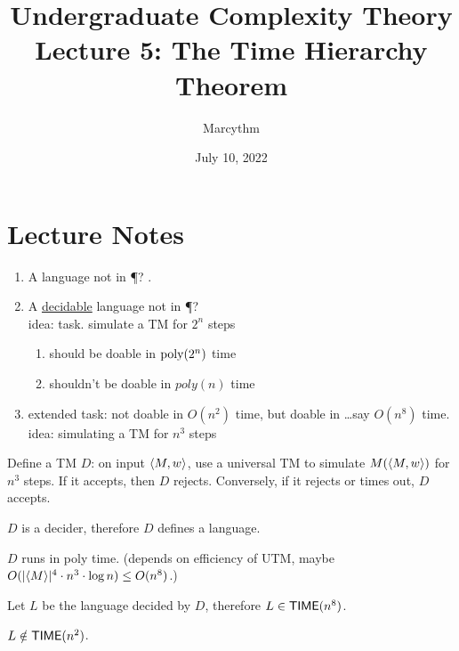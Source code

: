 \documentclass{article}
\title{Undergraduate Complexity Theory \\ Lecture 5: The Time Hierarchy Theorem}
\author{Marcythm}
\date{July 10, 2022}
\begin{document}
\maketitle{}

\section{Lecture Notes}

\begin{enumerate}
  \item A language not in \P? .

  \item A \ul{decidable} language not in \P? \\
        idea: task. simulate a TM for \(2^n\) steps
  \begin{enumerate}
    \item should be doable in \(\operatorname{poly}(2^n)\) time
    \item shouldn't be doable in \(poly(n)\) time
  \end{enumerate}

  \item extended task: not doable in \(O(n^2)\) time, but doable in \ldots say \(O(n^8)\) time. \\
        idea: simulating a TM for \(n^3\) steps
\end{enumerate}

\begin{definition}
  Define a TM \(D\): on input \(\langle M, w\rangle\), use a universal TM to simulate \(M\lparen\langle M, w\rangle\rparen\) for \(n^3\) steps. If it accepts, then \(D\) rejects. Conversely, if it rejects or times out, \(D\) accepts.
\end{definition}

\begin{fact}
  \(D\) is a decider, therefore \(D\) defines a language.
\end{fact}

\begin{fact}
  \(D\) runs in poly time. (depends on efficiency of UTM, maybe \(O\lparen\lvert\langle M\rangle\rvert^4 \cdot n^3 \cdot \log{n}\rparen \leq O(n^8)\).)
\end{fact}

\begin{fact}
  Let \(L\) be the language decided by \(D\), therefore \(L \in \text{\sf TIME}(n^8)\).
\end{fact}

\begin{claim}
  \(L \notin \text{\sf TIME}(n^2)\).
\end{claim}
\end{document}
